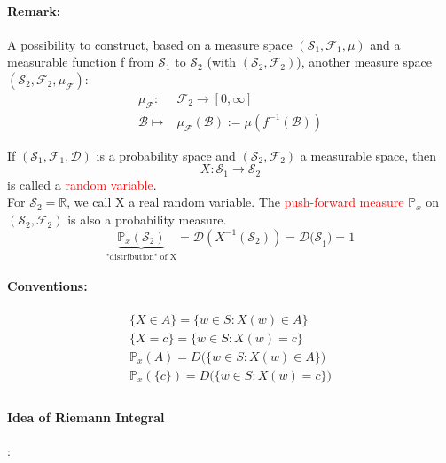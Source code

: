 \documentclass[10pt,a4paper]{article}
\theoremstyle{definition}
\theoremstyle{plain}
\begin{document}
\paragraph{Remark:} A possibility to construct, based on a measure space $(\mathcal{S}_1, \mathcal{F}_1, \mu)$ and a measurable function f from $\mathcal{S}_1$ to $\mathcal{S}_2$ (with $(\mathcal{S}_2, \mathcal{F}_2)$), another measure space $(\mathcal{S}_2, \mathcal{F}_2, \mu_{\mathcal{F}})$:
\begin{eqnarray*}
	\mu_\mathcal{F}: & \mathcal{F}_2 \rightarrow [0, \infty] \\
	 \mathcal{B}\mapsto & \mu_\mathcal{F}(\mathcal{B}) := \mu(f^{-1} (\mathcal{B}))
\end{eqnarray*}  
\begin{boxeddef}
	If $(\mathcal{S}_1, \mathcal{F}_1, \mathcal{D})$ is a probability space and $(\mathcal{S}_2, \mathcal{F}_2)$ a measurable space, then
	$$X: \mathcal{S}_1 \rightarrow \mathcal{S}_2$$
	is called a \textcolor{red}{random variable}. \\
	For $\mathcal{S}_2 = \mathbb{R}$, we call X a real random variable. The \textcolor{red}{push-forward measure} $\mathbb{P}_x$ on $(\mathcal{S}_2, \mathcal{F}_2)$ is also a probability measure.
	$$\underbrace{\mathbb{P}_x(\mathcal{S}_2)}_{\text{"distribution" of X}} = \mathcal{D}(X^{-1}(\mathcal{S}_2)) = \mathcal{D(S}_1) = 1$$
\end{boxeddef}
\paragraph{Conventions:}
\begin{eqnarray*}
\{ X \in A \} = \{w \in S: X(w) \in A \}\\
\{X = c\} = \{w \in S: X(w) = c\}\\
\mathbb{P}_x(A) = D\big(\{w \in S: X(w) \in A\}\big)\\
\mathbb{P}_x(\{c\}) = D\big(\{w \in S: X(w) = c\}\big)\\	
\end{eqnarray*}

\paragraph{Idea of Riemann Integral}:
\end{document}
